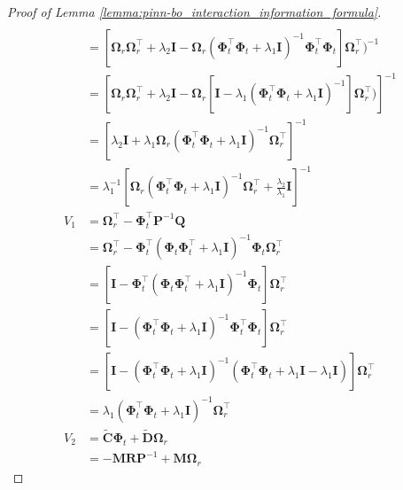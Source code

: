 \begin{proof}[Proof of Lemma \ref{lemma:pinn-bo_interaction_information_formula}]
\begin{align*}
\\
            &= \left[\boldsymbol{\Omega}_r \boldsymbol{\Omega}_r^\top  + \lambda_2\mathbf{I} - \boldsymbol{\Omega}_r (\boldsymbol{\Phi}_t^\top \boldsymbol{\Phi}_t+ \lambda_1\mathbf{I})^{-1} \boldsymbol{\Phi}_t^\top \boldsymbol{\Phi}_t \right] \boldsymbol{\Omega}_r^\top)^{-1} 
\\ 
            &= \left[\boldsymbol{\Omega}_r \boldsymbol{\Omega}_r^\top  + \lambda_2\mathbf{I} - \boldsymbol{\Omega}_r \left[ \mathbf{I} - \lambda_1(\boldsymbol{\Phi}_t^\top \boldsymbol{\Phi}_t+ \lambda_1\mathbf{I})^{-1} \right] \boldsymbol{\Omega}_r^\top)\right]^{-1} 
\\ 
            &= \left[\lambda_2\mathbf{I} + \lambda_1\boldsymbol{\Omega}_r(\boldsymbol{\Phi}_t^\top \boldsymbol{\Phi}_t+ \lambda_1\mathbf{I})^{-1}\boldsymbol{\Omega}_r^\top\right]^{-1} 
\\
            &= \lambda_1^{-1} \left[\boldsymbol{\Omega}_r(\boldsymbol{\Phi}_t^\top \boldsymbol{\Phi}_t+ \lambda_1\mathbf{I})^{-1}\boldsymbol{\Omega}_r^\top + \frac{\lambda_2} {\lambda_1} \mathbf{I}\right]^{-1} 
\\
            V_1 & = \boldsymbol{\Omega}_r^\top - \boldsymbol{\Phi}_t^\top \mathbf{P}^{-1} \mathbf{Q}
\\
            & = \boldsymbol{\Omega}_r^\top - \boldsymbol{\Phi}_t^\top (\boldsymbol{\Phi}_t\boldsymbol{\Phi}_t^\top + \lambda_1\mathbf{I})^{-1} \boldsymbol{\Phi}_t \boldsymbol{\Omega}_r^\top 
\\
            &=\left[ \mathbf{I} - \boldsymbol{\Phi}_t^\top (\boldsymbol{\Phi}_t\boldsymbol{\Phi}_t^\top + \lambda_1\mathbf{I})^{-1} \boldsymbol{\Phi}_t\right] \boldsymbol{\Omega}_r^\top 
\\
            & = \left[ \mathbf{I} - (\boldsymbol{\Phi}_t^\top\boldsymbol{\Phi}_t + \lambda_1\mathbf{I})^{-1} \boldsymbol{\Phi}_t^\top\boldsymbol{\Phi}_t\right] \boldsymbol{\Omega}_r^\top 
\\
            & = \left[ \mathbf{I} - (\boldsymbol{\Phi}_t^\top\boldsymbol{\Phi}_t + \lambda_1\mathbf{I})^{-1} (\boldsymbol{\Phi}_t^\top\boldsymbol{\Phi}_t +\lambda_1 \mathbf{I} - \lambda_1 \mathbf{I})\right] \boldsymbol{\Omega}_r^\top 
\\
            & = \lambda_1(\boldsymbol{\Phi}_t^\top\boldsymbol{\Phi}_t + \lambda_1\mathbf{I})^{-1} \boldsymbol{\Omega}_r^\top 
\\
            V_2 & = \widetilde{\mathbf{C}}\boldsymbol{\Phi}_t  + \widetilde{\mathbf{D}}\boldsymbol{\Omega}_r 
\\
            & = -\mathbf{M}\mathbf{R}\mathbf{P}^{-1} + \mathbf{M}\boldsymbol{\Omega}_r 

\end{align*}
\end{proof}
